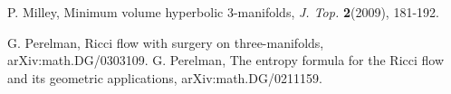 \begin{thebibliography}{GHMTY}
 P. Milley, Minimum volume hyperbolic 3-manifolds, \textit {J. Top.} \textbf {2}(2009), 181-192.

{} G. Perelman, Ricci flow with surgery on three-manifolds, arXiv:math.DG/0303109.
 G. Perelman, The entropy formula for the Ricci flow and its geometric applications,
arXiv:math.DG/0211159.

% 


\end{thebibliography}

 
